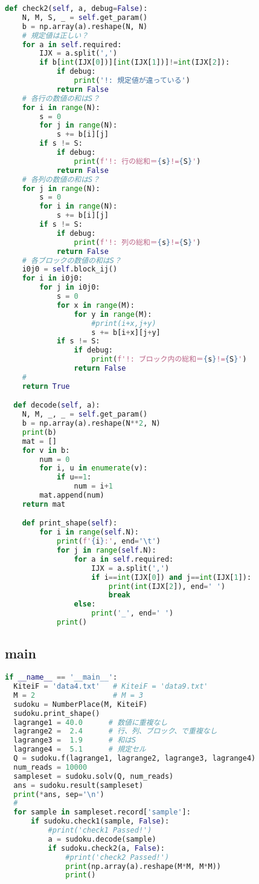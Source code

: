 \documentclass[uplatex,dvipdfmx,a4paper,11pt,oneside,openany]{jsbook}
\begin{document}
\begin{lstlisting}[language=Python]
  def check2(self, a, debug=False):
    N, M, S, _ = self.get_param()
    b = np.array(a).reshape(N, N)
    # 規定値は正しい？
    for a in self.required:
        IJX = a.split(',')
        if b[int(IJX[0])][int(IJX[1])]!=int(IJX[2]):
            if debug:
                print('!: 規定値が違っている')
            return False
    # 各行の数値の和はS？
    for i in range(N):
        s = 0
        for j in range(N):
            s += b[i][j]
        if s != S:
            if debug:
                print(f'!: 行の総和＝{s}!={S}')
            return False
    # 各列の数値の和はS？
    for j in range(N):
        s = 0
        for i in range(N):
            s += b[i][j]
        if s != S:
            if debug:
                print(f'!: 列の総和＝{s}!={S}')
            return False
    # 各ブロックの数値の和はS？
    i0j0 = self.block_ij()
    for i in i0j0:
        for j in i0j0:
            s = 0
            for x in range(M):
                for y in range(M):
                    #print(i+x,j+y)
                    s += b[i+x][j+y]
            if s != S:
                if debug:
                    print(f'!: ブロック内の総和＝{s}!={S}')
                return False
    #
    return True

  def decode(self, a):
    N, M, _, _ = self.get_param()
    b = np.array(a).reshape(N**2, N)
    print(b)
    mat = []
    for v in b:
        num = 0
        for i, u in enumerate(v):
            if u==1:
                num = i+1
        mat.append(num)
    return mat

    def print_shape(self):
        for i in range(self.N):
            print(f'{i}:', end='\t')
            for j in range(self.N):
                for a in self.required:
                    IJX = a.split(',')
                    if i==int(IJX[0]) and j==int(IJX[1]):
                        print(int(IJX[2]), end=' ')
                        break
                else:
                    print('_', end=' ')
            print()
\end{lstlisting}

\subsection{main}

\begin{lstlisting}[language=Python]
if __name__ == '__main__':
  KiteiF = 'data4.txt'   # KiteiF = 'data9.txt'
  M = 2                  # M = 3
  sudoku = NumberPlace(M, KiteiF)
  sudoku.print_shape()
  lagrange1 = 40.0      # 数値に重複なし
  lagrange2 =  2.4      # 行、列、ブロック、で重複なし
  lagrange3 =  1.9      # 和はS
  lagrange4 =  5.1      # 規定セル
  Q = sudoku.f(lagrange1, lagrange2, lagrange3, lagrange4)
  num_reads = 10000
  sampleset = sudoku.solv(Q, num_reads)
  ans = sudoku.result(sampleset)
  print(*ans, sep='\n')
  #
  for sample in sampleset.record['sample']:
      if sudoku.check1(sample, False):
          #print('check1 Passed!')
          a = sudoku.decode(sample)
          if sudoku.check2(a, False):
              #print('check2 Passed!')
              print(np.array(a).reshape(M*M, M*M))
              print()
\end{lstlisting}
\end{document}

